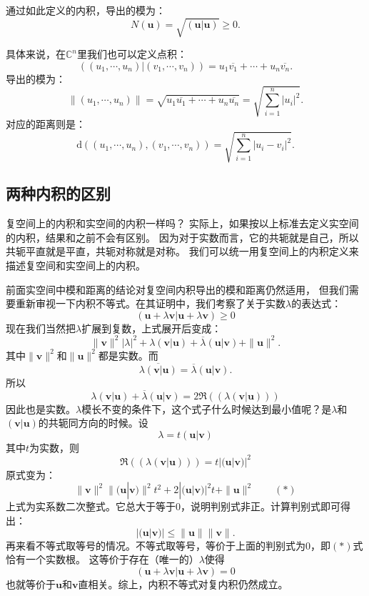 \documentclass[12pt,UTF8]{ctexbook}
\begin{document}
通过如此定义的内积，导出的模为：
$$ N(\mathbf{u}) = \sqrt{(\mathbf{u}|\mathbf{u})} \geqslant 0.$$

具体来说，在$\mathbb{C}^n$里我们也可以定义点积：
$$ \left((u_1, \cdots, u_n)|(v_1, \cdots, v_n)\right) = u_1\overline{v_1} + \cdots + u_n\overline{v_n}.$$
导出的模为：
$$ \| (u_1, \cdots, u_n)\| = \sqrt{u_1\overline{u_1} + \cdots + u_n\overline{u_n}} = \sqrt{\sum_{i=1}^n |u_i|^2}. $$
对应的距离则是：
$$ \mathrm{d} \left((u_1, \cdots, u_n), (v_1, \cdots, v_n)\right)= \sqrt{\sum_{i=1}^n |u_i - v_i|^2}. $$

\subsection{两种内积的区别}
复空间上的内积和实空间的内积一样吗？
实际上，如果按以上标准去定义实空间的内积，结果和之前不会有区别。
因为对于实数而言，它的共轭就是自己，所以共轭平直就是平直，共轭对称就是对称。
我们可以统一用复空间上的内积定义来描述复空间和实空间上的内积。

前面实空间中模和距离的结论对复空间内积导出的模和距离仍然适用，
但我们需要重新审视一下内积不等式。在其证明中，我们考察了关于实数$\lambda$的表达式：
$$ (\mathbf{u}+ \lambda\mathbf{v} |\mathbf{u}+ \lambda\mathbf{v} ) \geqslant 0 $$
现在我们当然把$\lambda$扩展到复数，上式展开后变成：
$$ \|\mathbf{v} \|^2 |\lambda|^2 + \lambda(\mathbf{v} | \mathbf{u}) + \overline{\lambda}(\mathbf{u} | \mathbf{v}) + \|\mathbf{u} \|^2.$$
其中$\|\mathbf{v} \|^2$和$\|\mathbf{u} \|^2$都是实数。而
$$ \overline{\lambda(\mathbf{v} | \mathbf{u})} = \overline{\lambda}(\mathbf{u} | \mathbf{v}).$$
所以
$$\lambda(\mathbf{v} | \mathbf{u}) + \overline{\lambda}(\mathbf{u} | \mathbf{v}) = 2\Re(\left(\lambda(\mathbf{v} | \mathbf{u})\right)) $$
因此也是实数。$\lambda$模长不变的条件下，这个式子什么时候达到最小值呢？是$\lambda$和$(\mathbf{v} | \mathbf{u})$的共轭同方向的时候。设
$$ \lambda = t (\mathbf{u} | \mathbf{v})$$
其中$t$为实数，则
$$ \Re(\left(\lambda(\mathbf{v} | \mathbf{u})\right)) = t| (\mathbf{u} | \mathbf{v})|^2$$
原式变为：
$$ \|\mathbf{v} \|^2 \| (\mathbf{u} | \mathbf{v})\|^2 t^2 + 2| (\mathbf{u} | \mathbf{v})|^2 t + \|\mathbf{u} \|^2 \quad \quad (*)$$
上式为实系数二次整式。它总大于等于0，说明判别式非正。计算判别式即可得出：
$$ | (\mathbf{u} | \mathbf{v})| \leqslant \|\mathbf{u} \| \|\mathbf{v} \|.$$
再来看不等式取等号的情况。不等式取等号，等价于上面的判别式为0，即$(*)$式恰有一个实数根。
这等价于存在（唯一的）$\lambda$使得
$$ (\mathbf{u}+ \lambda\mathbf{v} |\mathbf{u}+ \lambda\mathbf{v} ) = 0 $$
也就等价于$\mathbf{u}$和$\mathbf{v}$直相关。综上，内积不等式对复内积仍然成立。
\end{document}
